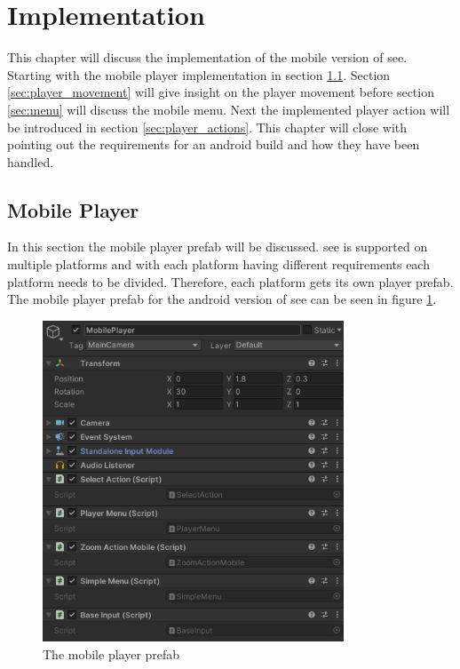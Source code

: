 \section{Implementation}
\label{section:implementation}

This chapter will discuss the implementation of the mobile version of \gls{see}.
Starting with the mobile player implementation in section \ref{sec:player}.
Section \ref{sec:player_movement} will give insight on the player movement before section \ref{sec:menu} will discuss the mobile menu.
Next the implemented player action will be introduced in section \ref{sec:player_actions}.
This chapter will close with pointing out the requirements for an \gls{android} build and how they have been handled.
\subsection{Mobile Player}
\label{sec:player}
In this section the mobile player \gls{prefab} will be discussed. 
\gls{see} is supported on multiple platforms and with each platform having different requirements each platform needs to be divided.
Therefore, each platform gets its own player \gls{prefab}.
The mobile player prefab for the \gls{android} version of \gls{see} can be seen in figure \ref{fig:prefab}.

\begin{figure}[htb]
    \centering
    \includegraphics[width=0.8\textwidth]{Implementation/img/mobile_player.png}
    \caption{The mobile player \gls{prefab}}\label{fig:prefab}
\end{figure}

